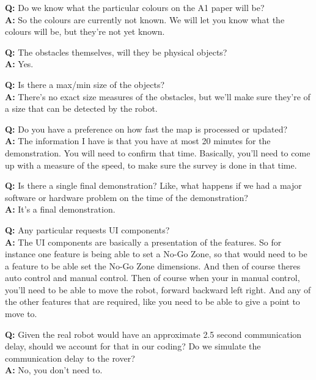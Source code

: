 \documentclass{article}
\newcounter{qcounter}
\begin{document}
\begin{list}{:~}{}
\item \textbf{Q:} Do we know what the particular colours on the A1 paper will be?\\
\textbf{A:} So the colours are currently not known. We will let you know what the colours will be, but they’re not yet known.
\item \textbf{Q:} The obstacles themselves, will they be physical objects?\\
\textbf{A:} Yes.\\
\item \textbf{Q:} Is there a max/min size of the objects?\\
\textbf{A:} There’s no exact size measures of the obstacles, but we’ll make sure they’re of a size that can be detected by the robot.\\
\item \textbf{Q:} Do you have a preference on how fast the map is processed or updated?\\
\textbf{A:} The information I have is that you have at most 20 minutes for the demonstration. You will need to confirm that time. Basically, you’ll need to come up with a measure of the speed, to make sure the survey is done in that time.\\
\item \textbf{Q:} Is there a single final demonstration? Like, what happens if we had a major software or hardware problem on the time of the demonstration?\\
\textbf{A:} It’s a final demonstration.\\
\item \textbf{Q:} Any particular requests UI components?\\
\textbf{A:} The UI components are basically a presentation of the features. So for instance one feature is being able to set a No-Go Zone, so that would need to be a feature to be able set the No-Go Zone dimensions. And then of course theres auto control and manual control. Then of course when your in manual control, you’ll need to be able to move the robot, forward backward left right. And any of the other features that are required, like you need to be able to give a point to move to.\\
\item \textbf{Q:} Given the real robot would have an approximate 2.5 second communication delay, should we account for that in our coding? Do we simulate the communication delay to the rover?\\
\textbf{A:} No, you don’t need to.\\

\end{list}
\end{document}
